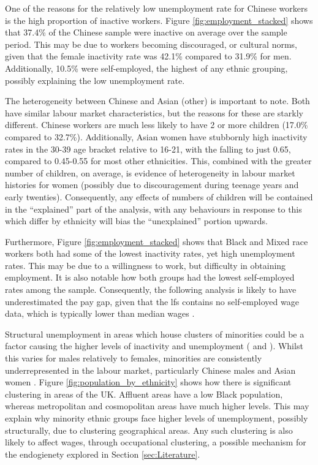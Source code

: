 \documentclass[class=article, crop=false]{standalone}
\begin{document}
One of the reasons for the relatively low unemployment rate for Chinese workers is the high proportion of inactive workers. Figure \ref{fig:employment_stacked} shows that 37.4\% of the Chinese sample were inactive on average over the sample period. This may be due to workers becoming discouraged, or cultural norms, given that the female inactivity rate was 42.1\% compared to 31.9\% for men. Additionally, 10.5\% were self-employed, the highest of any ethnic grouping, possibly explaining the low unemployment rate.

The heterogeneity between Chinese and Asian (other) is important to note. Both have similar labour market characteristics, but the reasons for these are starkly different. Chinese workers are much less likely to have 2 or more children (17.0\% compared to 32.7\%). Additionally, Asian women have stubbornly high inactivity rates in the 30-39 age bracket relative to 16-21, with the falling to just 0.65, compared to 0.45-0.55 for most other ethnicities. This, combined with the greater number of children, on average, is evidence of heterogeneity in labour market histories for women (possibly due to discouragement during teenage years and early twenties). Consequently, any effects of numbers of children will be contained in the \enquote{explained} part of the analysis, with any behaviours in response to this which differ by ethnicity will bias the \enquote{unexplained} portion upwards.

Furthermore, Figure \ref{fig:employment_stacked} shows that Black and Mixed race workers both had some of the lowest inactivity rates, yet high unemployment rates. This may be due to a willingness to work, but difficulty in obtaining employment. It is also notable how both groups had the lowest self-employed rates among the sample. Consequently, the following analysis is likely to have underestimated the pay gap, given that the \acrshort{lfs} contains no self-employed wage data, which is typically lower than median wages \citep{GOVf}.

Structural unemployment in areas which house clusters of minorities could be a factor causing the higher levels of inactivity and unemployment (\citet{Platt} and \citet{Berthoud}). Whilst this varies for males relatively to females, minorities are consistently underrepresented in the labour market, particularly Chinese males and Asian women \citep{Longhi2}. Figure \ref{fig:population_by_ethnicity} shows how there is significant clustering in areas of the UK. Affluent areas have a low Black population, whereas metropolitan and cosmopolitan areas have much higher levels. This may explain why minority ethnic groups face higher levels of unemployment, possibly structurally, due to clustering geographical areas. Any such clustering is also likely to affect wages, through occupational clustering, a possible mechanism for the endogienety explored in Section \ref{sec:Literature}.
\end{document}
